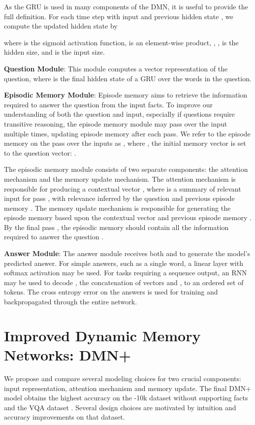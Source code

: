\documentclass{article}
\begin{document}
As the GRU is used in many components of the DMN, it is useful to provide the full definition.
For each time step  with input  and previous hidden state , we compute the updated hidden state  by

where  is the sigmoid activation function,  is an element-wise product, , ,  is the hidden size, and  is the input size.



\textbf{Question Module}:
This module computes a vector representation  of the question, where  is the final hidden state of a GRU over the words in the question.


\textbf{Episodic Memory Module}:
Episode memory aims to retrieve the information required to answer the question  from the input facts.
To improve our understanding of both the question and input, especially if questions require transitive reasoning, the episode memory module may pass over the input multiple times, updating episode memory after each pass.
We refer to the episode memory on the  pass over the inputs as , where , the initial memory vector is set to the question vector: .


The episodic memory module consists of two separate components: the attention mechanism and the memory update mechanism.
The attention mechanism is responsible for producing a contextual vector , where  is a summary of relevant input for pass , with relevance inferred by the question  and previous episode memory .
The memory update mechanism is responsible for generating the episode memory  based upon the contextual vector  and previous episode memory .
By the final pass , the episodic memory  should contain all the information required to answer the question .

\textbf{Answer Module}:
The answer module receives both  and  to generate the model's predicted answer.
For simple answers, such as a single word, a linear layer with softmax activation may be used.
For tasks requiring a sequence output, an RNN may be used to decode , the concatenation of vectors  and ,  to an ordered set of tokens.
The cross entropy error on the answers is used for training and backpropagated through the entire network.


\section{Improved Dynamic Memory Networks: DMN+}
We propose and compare several modeling choices for two crucial components: input representation, attention mechanism and memory update. The final DMN+ model obtains the highest accuracy on the \babi-10k dataset without supporting facts and the VQA dataset \cite{Antol2015}. Several design choices are motivated by intuition and accuracy improvements on that dataset. 
\end{document}
